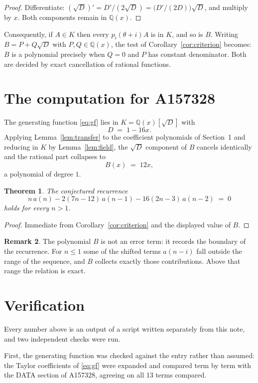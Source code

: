 \documentclass[11pt,a4paper]{article}
\theoremstyle{plain}
\newtheorem{theorem}{Theorem}
\theoremstyle{definition}
\newtheorem{remark}[theorem]{Remark}
\begin{document}
\begin{proof}
Differentiate: $(\sqrt{D})'=D'/(2\sqrt{D})=\bigl(D'/(2D)\bigr)\sqrt{D}$, and multiply by
$x$. Both components remain in $\mathbb{Q}(x)$.
\end{proof}

Consequently, if $A\in K$ then every $p_{i}(\theta+i)A$ is in $K$, and so is $B$. Writing
$B=P+Q\sqrt{D}$ with $P,Q\in\mathbb{Q}(x)$, the test of Corollary~\ref{cor:criterion}
becomes: $B$ is a polynomial precisely when $Q=0$ and $P$ has constant denominator. Both
are decided by exact cancellation of rational functions.

\section{The computation for A157328}

The generating function \eqref{eq:gf} lies in $K=\mathbb{Q}(x)[\sqrt{D}]$ with
\[
D \;=\; 1 - 16 x .
\]
Applying Lemma~\ref{lem:transfer} to the coefficient polynomials of Section~1 and reducing
in $K$ by Lemma~\ref{lem:field}, the $\sqrt{D}$ component of $B$ cancels identically and
the rational part collapses to
\[
B(x)\;=\;12 x ,
\]
a polynomial of degree $1$.

\begin{theorem}
The conjectured recurrence
\[
n\,a(n) -  2 \left(7 n - 12\right)\,a(n-1) -  16 \left(2 n - 3\right)\,a(n-2) \;=\;0
\]
holds for every $n>1$.
\end{theorem}

\begin{proof}
Immediate from Corollary~\ref{cor:criterion} and the displayed value of $B$.
\end{proof}

\begin{remark}
The polynomial $B$ is not an error term: it records the boundary of the recurrence. For
$n\le1$ some of the shifted terms $a(n-i)$ fall outside the range of the sequence,
and $B$ collects exactly those contributions. Above that range the relation is exact.
\end{remark}

\section{Verification}

Every number above is an output of a script written separately from this note, and two
independent checks were run.

First, the generating function was checked against the entry rather than assumed: the
Taylor coefficients of \eqref{eq:gf} were expanded and compared term by term with the DATA
section of A157328, agreeing on all 13 terms compared.
\end{document}
